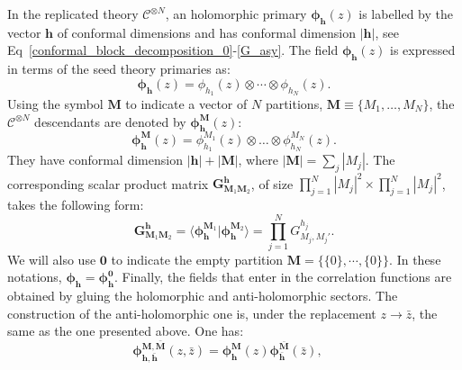 \documentclass[a4paper,11pt]{article}
\begin{document}
\noindent In the replicated theory  $\mathcal{C}^{\otimes N}$, an holomorphic primary $\boldsymbol{\phi}_{\boldsymbol{h}}(z)$  is labelled by the vector $\boldsymbol{h}$ of conformal dimensions  and has conformal dimension $|\boldsymbol{h}|$, see Eq~\eqref{conformal_block_decomposition_0}-\eqref{G_asy}. The field $\boldsymbol{\phi}_{\boldsymbol{h}}(z)$ is expressed in terms of the seed theory primaries as:
\begin{equation}
\boldsymbol{\phi}_{\boldsymbol{h}}(z)=\phi_{h_1}(z)\otimes \cdots\otimes \phi_{h_N}(z).
\end{equation}
Using the symbol $\boldsymbol{M}$ to indicate a vector of $N$ partitions, $\boldsymbol{M}\equiv\{M_1,\dots,M_N\}$,  the  $\mathcal{C}^{\otimes N}$ descendants are denoted by  $\boldsymbol{\phi}^{\boldsymbol{M}}_{\boldsymbol{h}}(z)$:
 \begin{equation}
 \boldsymbol{\phi}_{\boldsymbol{h}}^{\boldsymbol{M}}(z)=\phi_{h_1}^{M_1}(z)\otimes \dots \otimes \phi_{h_N}^{M_N}(z).
\end{equation}
They have conformal dimension $|\boldsymbol{h}|+|\boldsymbol{M}|$, where $|\boldsymbol{M}|=\sum_j |M_j|$. 
The corresponding scalar product matrix $\boldsymbol{G}^{\boldsymbol{h}}_{\boldsymbol{M}_1\boldsymbol{M}_2}$, of size $\prod_{j=1}^{N}|M_j|^2\times \prod_{j=1}^{N}|M_j|^2$, takes the following form:
\begin{equation}
\label{scal}
 \boldsymbol{G}^{\boldsymbol{h}}_{\boldsymbol{M}_1\boldsymbol{M}_2}=\langle \boldsymbol{\phi}_{\boldsymbol{h}}^{\boldsymbol{M}_1} | \boldsymbol{\phi}_{\boldsymbol{h}}^{\boldsymbol{M}_2}\rangle=\prod_{j=1}^N G^{h_j}_{M_j,M_j'}.
\end{equation}
We will also use $\boldsymbol{0}$ to indicate the empty partition $\boldsymbol{M}=\{\{0\},\cdots,\{0\}\}$. In these notations, $\boldsymbol{\phi}_{\boldsymbol{h}}=\boldsymbol{\phi}_{\boldsymbol{h}}^{\boldsymbol{0}}$. Finally, the fields that enter in the correlation functions are obtained by gluing the holomorphic and anti-holomorphic sectors.  The construction of the anti-holomorphic one is, under the replacement $z\to \bar{z}$, the same as the one presented above. One has:
\begin{equation}
\boldsymbol{\phi}^{\boldsymbol{M},\boldsymbol{\bar{M}}}_{\boldsymbol{h},\boldsymbol{\bar{h}}} (z,\bar{z})=\boldsymbol{\phi}^{\boldsymbol{M}}_{\boldsymbol{h}}(z)\boldsymbol{\phi}^{\boldsymbol{\bar{M}}}_{\boldsymbol{\bar{h}}}(\bar{z}), \quad 
\end{equation} 
\end{document}

